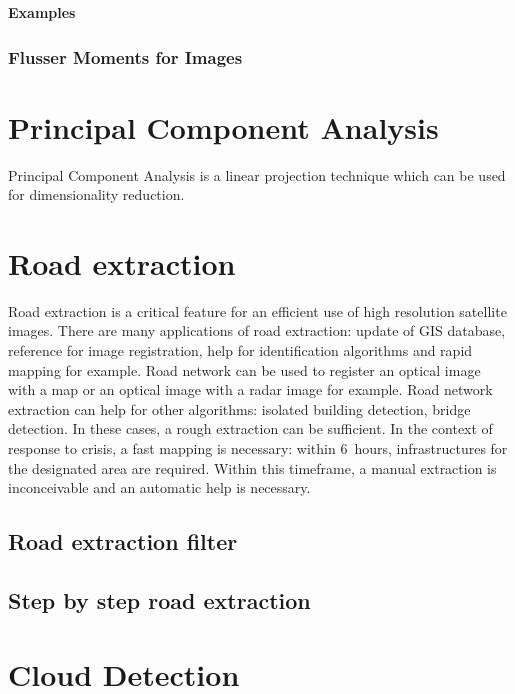 \textbf{Examples}
\subsubsection{Flusser Moments for Images}

%

\section{Principal Component Analysis}
Principal Component Analysis is a linear projection technique which
can be used for dimensionality reduction.


\section{Road extraction}
\label{sec:RoadExtraction}

Road extraction is a critical feature for an efficient use of high resolution satellite images. There are many applications of road extraction: update of GIS database, reference for image registration, help for identification algorithms and rapid mapping for example.  Road network can be used to register an optical image with a map or an optical image with a radar image for example. Road network extraction can help for other algorithms: isolated building detection, bridge detection. In these cases, a rough extraction can be sufficient. In the context of response to crisis, a fast mapping is necessary: within 6~hours, infrastructures for the designated area are required. Within this timeframe, a manual extraction is inconceivable and an automatic help is necessary.

\subsection{Road extraction filter}



\subsection{Step by step road extraction}




%
% 
%
% 

\section{Cloud Detection}


